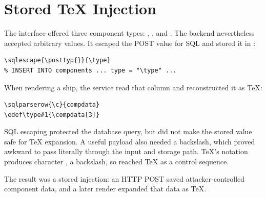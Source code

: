 \section{Stored TeX Injection}
\label{sec:stored-tex-injection}

The interface offered three component types: , ,
and . The backend nevertheless accepted arbitrary 
values. It escaped the POST value for SQL and stored it in
:

\begin{lstlisting}
\sqlescape{\posttyp{}}{\type}
% INSERT INTO components ... type = "\type" ...
\end{lstlisting}

When rendering a ship, the service read that column and reconstructed it as
TeX:

\begin{lstlisting}
\sqlparserow{\c}{compdata}
\edef\type#1{\compdata[3]}
\end{lstlisting}

SQL escaping protected the database query, but did not make the stored
value safe for TeX expansion. A useful payload also needed a backslash,
which proved awkward to pass literally through the input and storage path.
TeX's  notation produces character , a
backslash, so  reached TeX as a control sequence.

The result was a stored injection: an HTTP POST saved attacker-controlled
component data, and a later render expanded that data as TeX.
